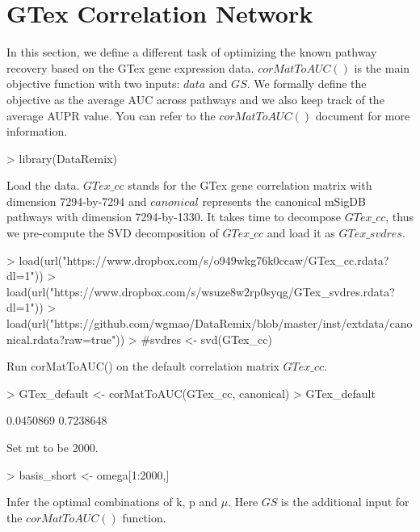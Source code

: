 \documentclass{article}
\begin{document}
\section{GTex Correlation Network}
In this section, we define a different task of optimizing the known pathway recovery based on the GTex gene expression data. $corMatToAUC()$ is the main objective function with two inputs: $data$ and $GS$. We formally define the objective as the average AUC across pathways and we also keep track of the average AUPR value. You can refer to the $corMatToAUC()$ document for more information.
\begin{Schunk}
\begin{Sinput}
> library(DataRemix)
\end{Sinput}
\end{Schunk}
Load the data. $GTex\_cc$ stands for the GTex gene correlation matrix with dimension 7294-by-7294 and $canonical$ represents the canonical mSigDB pathways with dimension 7294-by-1330. It takes time to decompose $GTex\_cc$, thus we pre-compute the SVD decomposition of $GTex\_cc$ and load it as $GTex\_svdres$.
\begin{Schunk}
\begin{Sinput}
> load(url("https://www.dropbox.com/s/o949wkg76k0ccaw/GTex_cc.rdata?dl=1"))
> load(url("https://www.dropbox.com/s/wsuze8w2rp0syqg/GTex_svdres.rdata?dl=1"))
> load(url("https://github.com/wgmao/DataRemix/blob/master/inst/extdata/canonical.rdata?raw=true"))
> #svdres <- svd(GTex_cc)
\end{Sinput}
\end{Schunk}
Run corMatToAUC() on the default correlation matrix $GTex\_cc$.
\begin{Schunk}
\begin{Sinput}
> GTex_default <- corMatToAUC(GTex_cc, canonical)
> GTex_default
\end{Sinput}
\begin{Soutput}
[1] 0.0450869 0.7238648
\end{Soutput}
\end{Schunk}
Set mt to be 2000.
\begin{Schunk}
\begin{Sinput}
> basis_short <- omega[1:2000,]
\end{Sinput}
\end{Schunk}
Infer the optimal combinations of k, p and $\mu$. Here $GS$ is the additional input for the $corMatToAUC()$ function.
\end{document}
